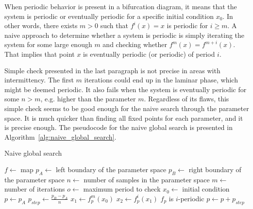 When periodic behavior is present in a bifurcation diagram, it means that the system is periodic or eventually periodic for a specific initial condition $x_0$.
In other words, there exists $m > 0$ such that $f^{i}(x)=x$ is periodic for $i \geq m$.
A naive approach to determine whether a system is periodic is simply iterating the system for some large enough $m$ and checking whether $f^{m}(x)=f^{m+i}(x)$.
That implies that point $x$ is eventually periodic (or periodic) of period $i$.
\par
Simple check presented in the last paragraph is not precise in areas with intermittency.
The first $m$ iterations could end up in the laminar phase, which might be deemed periodic.
It also fails when the system is eventually periodic for some $n > m$, e.g. higher than the parameter $m$.
Regardless of its flaws, this simple check seems to be good enough for the naive search through the parameter space.
It is much quicker than finding all fixed points for each parameter, and it is precise enough.
The pseudocode for the naive global search is presented in Algorithm~\ref{alg:naive_global_search}.

\begin{algorithm}[!h]
    \caption{Naive global search}
    \label{alg:naive_global_search}
    \begin{algorithmic}[1]
        \Statex $f \gets$ map
        \Statex $p_{A} \gets$ left boundary of the parameter space
        \Statex $p_{B} \gets$ right boundary of the parameter space
        \Statex $n \gets$ number of samples in the parameter space
        \Statex $m \gets$ number of iterations
        \Statex $o \gets$ maximum period to check
        \Statex $x_0 \gets$ initial condition
        \State $p \gets p_{A}$
        \State $p_{step} \gets \frac{p_{B} - p_{A}}{n}$
            \State $x_1 \gets f_{p}^{m}(x_0)$
                \State $x_2 \gets f_{p}^{i}(x_1)$
                    \State $f_p$ is $i$-periodic
                \EndIf
            \EndFor
            \State $p \gets p + p_{step}$
        \EndWhile
    \end{algorithmic}
\end{algorithm}

